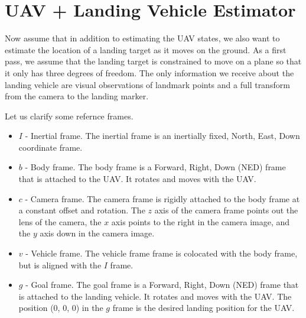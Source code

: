 
\section{UAV + Landing Vehicle Estimator}
Now assume that in addition to estimating the UAV states, we also want to
estimate the location of a landing target as it moves on the ground. As a first
pass, we assume that the landing target is constrained to move on a plane so
that it only has three degrees of freedom. The only information we receive about
the landing vehicle are visual observations of landmark points and a full
transform from the camera to the landing marker.

Let us clarify some refernce frames.
\begin{itemize}
  \item $I$ - Inertial frame. The inertial frame is an inertially fixed, North,
    East, Down coordinate frame.
  \item $b$ - Body frame. The body frame is a Forward, Right, Down (NED) frame
    that is attached to the UAV. It rotates and moves with the UAV.
  \item $c$ - Camera frame. The camera frame is rigidly attached to the body
    frame at a constant offset and rotation. The $z$ axis of the camera frame
    points out the lens of the camera, the $x$ axis points to the right in the
    camera image, and the $y$ axis down in the camera image.
  \item $v$ - Vehicle frame. The vehicle frame frame is colocated with the body
    frame, but is aligned with the $I$ frame.
  \item $g$ - Goal frame. The goal frame is a Forward, Right, Down (NED) frame
    that is attached to the landing vehicle. It rotates and moves with the UAV.
    The position (0, 0, 0) in the $g$ frame is the desired landing position for
    the UAV.
\end{itemize}

